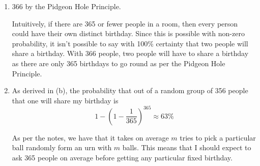 \begin{enumerate}
\item

366 by the Pidgeon Hole Principle. 

Intuitively, if there are 365 or fewer people in a room, then every person could
have their own distinct birthday. Since this is possible with non-zero
probability, it isn't possible to say with 100\% certainty that two people will
share a birthday. With 366 people, two people will have to share a birthday as
there are only 365 birthdays to go round as per the Pidgeon Hole Principle.
\item 

As derived in (b), the probability that out of a random group of 356 people that one
will share my birthday is 
\[1 - \left(1 - \frac{1}{365}\right)^365 \approx 63\%\]

As per the notes\cite{Slides_46}, we have that it takes on average $m$ tries to
pick a particular ball randomly form an urn with $m$ balls. This means that I
should expect to ask 365 people on average before getting any particular fixed
birthday.
\end{enumerate}
